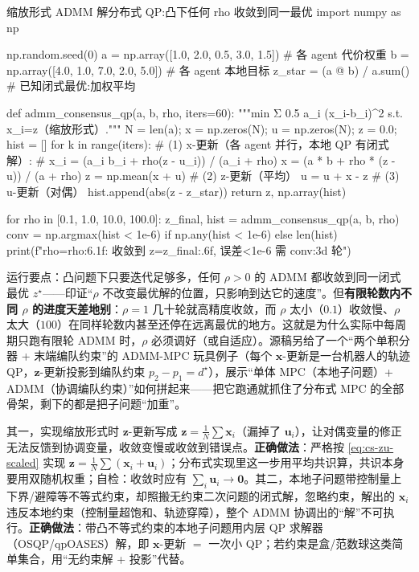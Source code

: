 \begin{codebox}[Python]{缩放形式 ADMM 解分布式 QP:凸下任何 rho 收敛到同一最优}
import numpy as np

np.random.seed(0)
a = np.array([1.0, 2.0, 0.5, 3.0, 1.5])   # 各 agent 代价权重
b = np.array([4.0, 1.0, 7.0, 2.0, 5.0])   # 各 agent 本地目标
z_star = (a @ b) / a.sum()                 # 已知闭式最优:加权平均

def admm_consensus_qp(a, b, rho, iters=60):
    """min Σ 0.5 a_i (x_i-b_i)^2 s.t. x_i=z（缩放形式）."""
    N = len(a); x = np.zeros(N); u = np.zeros(N); z = 0.0; hist = []
    for k in range(iters):
        # (1) x-更新（各 agent 并行，本地 QP 有闭式解）:
        #    x_i = (a_i b_i + rho(z - u_i)) / (a_i + rho)
        x = (a * b + rho * (z - u)) / (a + rho)
        z = np.mean(x + u)                  # (2) z-更新（平均）
        u = u + x - z                       # (3) u-更新（对偶）
        hist.append(abs(z - z_star))
    return z, np.array(hist)

for rho in [0.1, 1.0, 10.0, 100.0]:
    z_final, hist = admm_consensus_qp(a, b, rho)
    conv = np.argmax(hist < 1e-6) if np.any(hist < 1e-6) else len(hist)
    print(f"rho={rho:6.1f}: 收敛到 z={z_final:.6f}, 误差<1e-6 需 {conv:3d} 轮")
\end{codebox}

\noindent 运行要点：凸问题下只要迭代足够多，任何 $\rho>0$ 的 ADMM 都收敛到同一闭式最优 $z^\star$——印证“$\rho$ 不改变最优解的位置，只影响到达它的速度”。但\textbf{有限轮数内不同 $\rho$ 的进度天差地别}：$\rho=1$ 几十轮就高精度收敛，而 $\rho$ 太小（$0.1$）收敛慢、$\rho$ 太大（$100$）在同样轮数内甚至还停在远离最优的地方。这就是为什么实际中每周期只跑有限轮 ADMM 时，$\rho$ 必须调好（或自适应）。源稿另给了一个“两个单积分器 + 末端编队约束”的 ADMM-MPC 玩具例子（每个 $\mathbf{x}$-更新是一台机器人的轨迹 QP，$\mathbf{z}$-更新投影到编队约束 $p_2-p_1=d^\star$），展示“单体 MPC（本地子问题）+ ADMM（协调编队约束）”如何拼起来——把它跑通就抓住了分布式 MPC 的全部骨架，剩下的都是把子问题“加重”。

\begin{pitfall}
其一，实现缩放形式时 $\mathbf{z}$-更新写成 $\mathbf{z}=\tfrac1N\sum\mathbf{x}_i$（漏掉了 $\mathbf{u}_i$），让对偶变量的修正无法反馈到协调变量，收敛变慢或收敛到错误点。\textbf{正确做法}：严格按 \cref{eq:cs-zu-scaled} 实现 $\mathbf{z}=\tfrac1N\sum(\mathbf{x}_i+\mathbf{u}_i)$；分布式实现里这一步用平均共识算，共识本身要用双随机权重；自检：收敛时应有 $\sum_i\mathbf{u}_i\to\mathbf{0}$。其二，本地子问题带控制量上下界/避障等不等式约束，却照搬无约束二次问题的闭式解，忽略约束，解出的 $\mathbf{x}_i$ 违反本地约束（控制量超饱和、轨迹穿障），整个 ADMM 协调出的“解”不可执行。\textbf{正确做法}：带凸不等式约束的本地子问题用内层 QP 求解器（OSQP/qpOASES）解，即 $\mathbf{x}$-更新 $=$ 一次小 QP；若约束是盒/范数球这类简单集合，用“无约束解 + 投影”代替。
\end{pitfall}

